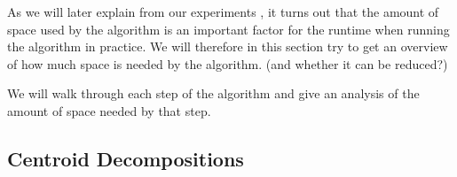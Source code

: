 As we will later explain from our experiments , it turns out that the amount of space used by the algorithm is an important factor for the runtime when running the algorithm in practice. We will therefore in this section try to get an overview of how much space is needed by the algorithm. (and whether it can be reduced?)

We will walk through each step of the algorithm and give an analysis of the amount of space needed by that step.

\subsection{Centroid Decompositions}